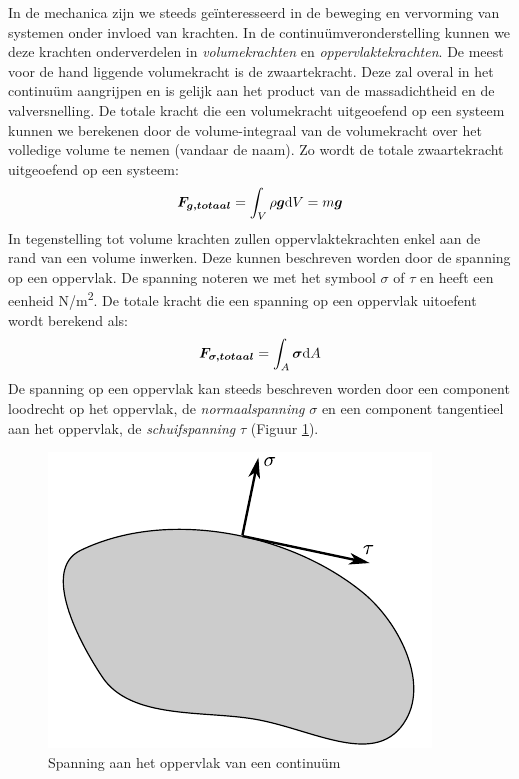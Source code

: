 In de mechanica zijn we steeds geïnteresseerd in de beweging en vervorming van systemen onder invloed van krachten. In de continuümveronderstelling kunnen we deze krachten onderverdelen in \emph{volumekrachten} en \emph{oppervlaktekrachten}. De meest voor de hand liggende volumekracht is de zwaartekracht. Deze zal overal in het continuüm aangrijpen en is gelijk aan het product van de massadichtheid en de valversnelling. De totale kracht die een volumekracht uitgeoefend op een systeem kunnen we berekenen door de volume-integraal van de volumekracht over het volledige volume te nemen (vandaar de naam). Zo wordt de totale zwaartekracht uitgeoefend op een systeem:
\begin{equation}
	\boldsymbol{F_{g,totaal}} = \int_V \rho \boldsymbol{g} \mathrm{d} V = m \boldsymbol{g}
	\label{eqn:volumekracht}
\end{equation}
In tegenstelling tot volume krachten zullen oppervlaktekrachten enkel aan de rand van een volume inwerken. Deze kunnen beschreven worden door de spanning op een oppervlak. De spanning noteren we met het symbool $\sigma$ of $\tau$ en heeft een eenheid  \unit{N/m^2}. De totale kracht die een spanning op een oppervlak uitoefent wordt berekend als: 
\begin{equation}
	\boldsymbol{F_{\sigma,totaal}} = \int_A \boldsymbol{\sigma} \mathrm{d} A
	\label{eqn:oppervlaktekracht}
\end{equation}
De spanning op een oppervlak kan steeds beschreven worden door een component loodrecht op het oppervlak, de \emph{normaalspanning} $\sigma$ en een component tangentieel aan het oppervlak, de \emph{schuifspanning} $\tau$ (Figuur \ref{fig:spanning}).
\begin{figure}[htb]
	\centering
	\includegraphics{fig/basisbegrippen/Spanning}
	\caption{Spanning aan het oppervlak van een continuüm}
	\label{fig:spanning}
\end{figure}


